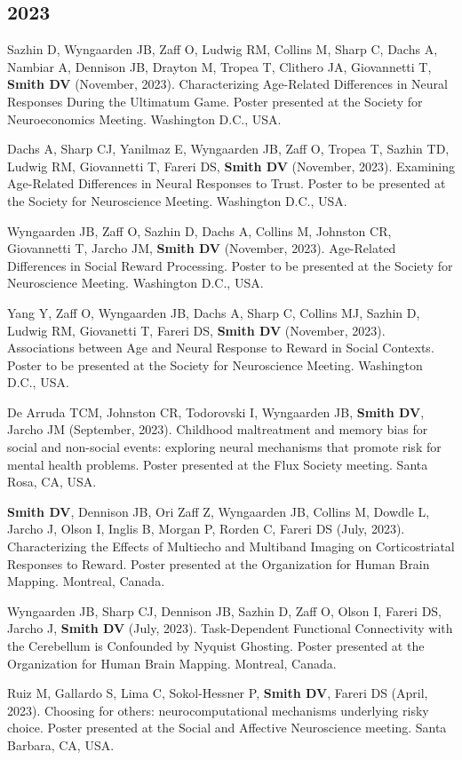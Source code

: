 \documentclass[11pt, letterpaper]{article}
\begin{document}
\subsection*{2023}
\begin{hangparas}{.5in}{1}

Sazhin D, Wyngaarden JB, Zaff O, Ludwig RM, Collins M, Sharp C, Dachs A, Nambiar A, Dennison JB, Drayton M, Tropea T, Clithero JA, Giovannetti T, \textbf{Smith DV} (November, 2023). Characterizing Age-Related Differences in Neural Responses During the Ultimatum Game. Poster presented at the Society for Neuroeconomics Meeting. Washington D.C., USA.

Dachs A, Sharp CJ, Yanilmaz E, Wyngaarden JB, Zaff O, Tropea T, Sazhin TD, Ludwig RM, Giovannetti T, Fareri DS, \textbf{Smith DV} (November, 2023). Examining Age-Related Differences in Neural Responses to Trust. Poster to be presented at the Society for Neuroscience Meeting. Washington D.C., USA.   

Wyngaarden JB, Zaff O, Sazhin D, Dachs A, Collins M, Johnston CR, Giovannetti T, Jarcho JM, \textbf{Smith DV} (November, 2023). Age-Related Differences in Social Reward Processing. Poster to be presented at the Society for Neuroscience Meeting. Washington D.C., USA.   

Yang Y, Zaff O, Wyngaarden JB, Dachs A, Sharp C, Collins MJ, Sazhin D, Ludwig RM, Giovanetti T, Fareri DS, \textbf{Smith DV} (November, 2023). Associations between Age and Neural Response to Reward in Social Contexts. Poster to be presented at the Society for Neuroscience Meeting. Washington D.C., USA.

De Arruda TCM, Johnston CR, Todorovski I, Wyngaarden JB, \textbf{Smith DV}, Jarcho JM (September, 2023). Childhood maltreatment and memory bias for social and non-social events: exploring neural mechanisms that promote risk for mental health problems. Poster presented at the Flux Society meeting. Santa Rosa, CA, USA. 

\textbf{Smith DV}, Dennison JB, Ori Zaff Z, Wyngaarden JB, Collins M, Dowdle L, Jarcho J, Olson I, Inglis B, Morgan P, Rorden C, Fareri DS (July, 2023). Characterizing the Effects of Multiecho and Multiband Imaging on Corticostriatal Responses to Reward. Poster presented at the Organization for Human Brain Mapping. Montreal, Canada.

Wyngaarden JB, Sharp CJ, Dennison JB, Sazhin D, Zaff O, Olson I, Fareri DS, Jarcho J, \textbf{Smith DV} (July, 2023). Task-Dependent Functional Connectivity with the Cerebellum is Confounded by Nyquist Ghosting. Poster presented at the Organization for Human Brain Mapping. Montreal, Canada.

Ruiz M, Gallardo S, Lima C, Sokol-Hessner P, \textbf{Smith DV}, Fareri DS (April, 2023). Choosing for others: neurocomputational mechanisms underlying risky choice. Poster presented at the Social and Affective Neuroscience meeting. Santa Barbara, CA, USA. \\


\end{hangparas}
\end{document}

